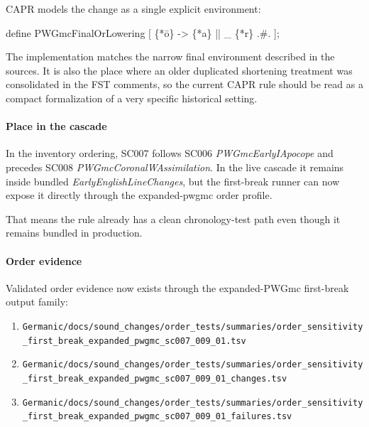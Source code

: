 \documentclass[
  british,
  a4paper,
]{article}
\newenvironment{Shaded}{}{}
\newcommand{\NormalTok}[1]{#1}
\providecommand{\tightlist}{%
  \setlength{\itemsep}{0pt}\setlength{\parskip}{0pt}}
\begin{document}
CAPR models the change as a single explicit environment:

\begin{Shaded}
\begin{Highlighting}[]
\NormalTok{define PWGmcFinalOrLowering [}
\NormalTok{    \{*ō\} {-}\textgreater{} \{*a\} || \_ \{*r\} .\#.}
\NormalTok{];}
\end{Highlighting}
\end{Shaded}

The implementation matches the narrow final environment described in the
sources. It is also the place where an older duplicated shortening
treatment was consolidated in the FST comments, so the current CAPR rule
should be read as a compact formalization of a very specific historical
setting.

\paragraph{Place in the cascade}\label{place-in-the-cascade-4}

In the inventory ordering, SC007 follows SC006 \emph{PWGmcEarlyIApocope}
and precedes SC008 \emph{PWGmcCoronalWAssimilation}. In the live cascade
it remains inside bundled \emph{EarlyEnglishLineChanges}, but the
first-break runner can now expose it directly through the expanded-pwgmc
order profile.

That means the rule already has a clean chronology-test path even though
it remains bundled in production.

\paragraph{Order evidence}\label{order-evidence-4}

Validated order evidence now exists through the expanded-PWGmc
first-break output family:

\begin{enumerate}
\def\labelenumi{\arabic{enumi}.}
\tightlist
\item
  \texttt{Germanic/docs/sound\_changes/order\_tests/summaries/order\_sensitivity\_first\_break\_expanded\_pwgmc\_sc007\_009\_01.tsv}
\item
  \texttt{Germanic/docs/sound\_changes/order\_tests/summaries/order\_sensitivity\_first\_break\_expanded\_pwgmc\_sc007\_009\_01\_changes.tsv}
\item
  \texttt{Germanic/docs/sound\_changes/order\_tests/summaries/order\_sensitivity\_first\_break\_expanded\_pwgmc\_sc007\_009\_01\_failures.tsv}
\end{enumerate}
\end{document}
